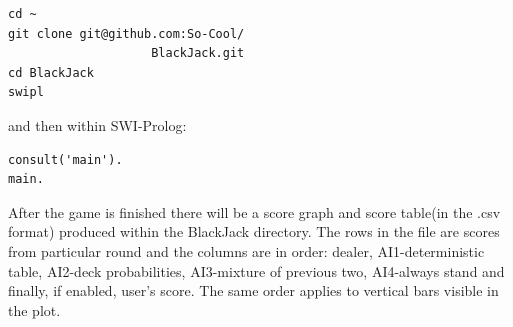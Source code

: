 \documentclass[12pt,a4paper,twocolumn]{article}
\begin{document}
\lstset{language=bash}
\begin{lstlisting}[frame=single]
cd ~
git clone git@github.com:So-Cool/
                    BlackJack.git
cd BlackJack
swipl
\end{lstlisting}

and then within SWI-Prolog:

\lstset{language=Prolog}
\begin{lstlisting}[frame=single]
consult('main').
main.
\end{lstlisting}


After the game is finished there will be a score graph and score table(in the .csv format) produced within the BlackJack directory. The rows in the file are scores from particular round and the columns are in order: dealer, AI1-deterministic table, AI2-deck probabilities, AI3-mixture of previous two, AI4-always stand and finally, if enabled, user's score. The same order applies to vertical bars visible in the plot.





\end{document}
